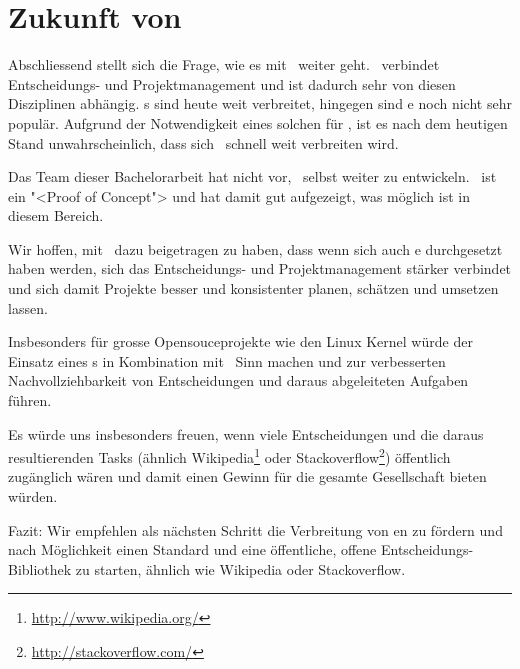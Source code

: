 	\section{Zukunft von \eeppi}
		Abschliessend stellt sich die Frage, wie es mit \eeppi\ weiter geht.
		\eeppi\ verbindet Ent\-schei\-dungs- und Pro\-jekt\-management und ist dadurch sehr von diesen Disziplinen abhängig.
		\ppt s sind heute weit verbreitet, hingegen sind \dks e noch nicht sehr populär.
		Aufgrund der Notwendigkeit eines solchen für \eeppi, ist es nach dem heutigen Stand unwahrscheinlich, dass sich \eeppi\ schnell weit verbreiten wird.
		
		Das Team dieser Bachelorarbeit hat nicht vor, \eeppi\ selbst weiter zu entwickeln.
		\eeppi\ ist ein "<Proof of Concept"> und hat damit gut aufgezeigt, was möglich ist in diesem Bereich.
		
		Wir hoffen, mit \eeppi\ dazu beigetragen zu haben, dass wenn sich auch \dks e durchgesetzt haben werden,
		sich das Entscheidungs- und Projektmanagement stärker verbindet und sich damit Projekte besser und konsistenter planen,  schätzen und umsetzen lassen.
		
		Insbesonders für grosse Opensouceprojekte wie den Linux Kernel würde der Einsatz eines \dks s in Kombination mit \eeppi\ Sinn machen und zur verbesserten Nachvollziehbarkeit von Entscheidungen und daraus abgeleiteten Aufgaben führen.
		
		Es würde uns insbesonders freuen,
		wenn viele Entscheidungen und die daraus resultierenden Tasks
		(ähnlich Wikipedia\footnote{\url{http://www.wikipedia.org/}} oder Stackoverflow\footnote{\url{http://stackoverflow.com/}})
		öffentlich zugänglich wären und damit einen Gewinn für die gesamte Gesellschaft bieten würden.
		
		Fazit: Wir empfehlen als nächsten Schritt die Verbreitung von \dks en zu fördern
		und nach Möglichkeit einen Standard und eine öffentliche, offene Entscheidungs-Bibliothek zu starten,
		ähnlich wie Wikipedia oder Stackoverflow.
